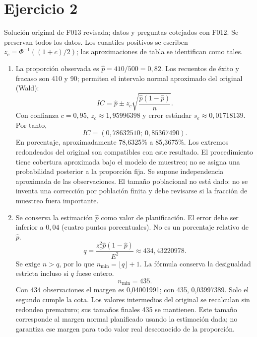 \documentclass[11pt]{article}
\begin{document}
\section*{Ejercicio 2}
Solución original de F013 revisada; datos y preguntas cotejados con F012. Se preservan todos los datos. Los cuantiles positivos se escriben $z_c=\Phi^{-1}((1+c)/2)$; las aproximaciones de tabla se identifican como tales.
\begin{enumerate}[label=(\alph*)]\item La proporción observada es $\widehat p=410/500=0,82$. Los recuentos de éxito y fracaso son 410 y 90; permiten el intervalo normal aproximado del original (Wald):
\[IC=\widehat p\pm z_c\sqrt{\frac{\widehat p(1-\widehat p)}{n}}.\]
Con confianza $c=0,95$, $z_c\approx1,95996398$ y error estándar $s_e\approx0,01718139$. Por tanto,
\[IC=\boxed{(0,78632510;\ 0,85367490)}.\]
En porcentaje, aproximadamente 78,6325\% a 85,3675\%. Los extremos redondeados del original son compatibles con este resultado.
El procedimiento tiene cobertura aproximada bajo el modelo de muestreo; no se asigna una probabilidad posterior a la proporción fija. Se supone independencia aproximada de las observaciones. El tamaño poblacional no está dado: no se inventa una corrección por población finita y debe revisarse si la fracción de muestreo fuera importante.
\item Se conserva la estimación $\widehat p$ como valor de planificación. El error debe ser inferior a $0,04$ (cuatro puntos porcentuales). No es un porcentaje relativo de $\widehat p$.
\[q=\frac{z_c^2\widehat p(1-\widehat p)}{E^2}\approx434,43220978.\]
Se exige $n>q$, por lo que $n_{\min}=\lfloor q\rfloor+1$. La fórmula conserva la desigualdad estricta incluso si $q$ fuese entero.
\[\boxed{n_{\min}=435}.\]
Con 434 observaciones el margen es 0,04001991; con 435, 0,03997389. Solo el segundo cumple la cota.
Los valores intermedios del original se recalculan sin redondeo prematuro; sus tamaños finales 435 se mantienen. Este tamaño corresponde al margen normal planificado usando la estimación dada; no garantiza ese margen para todo valor real desconocido de la proporción.
\end{enumerate}
\clearpage
\end{document}

